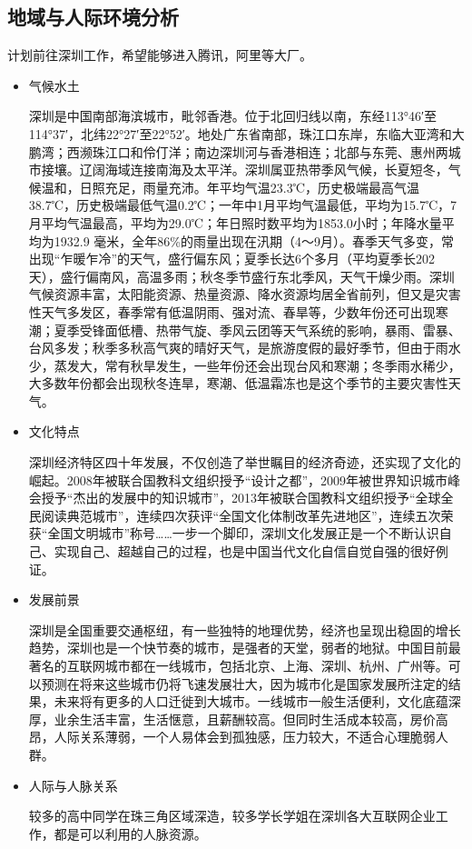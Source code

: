 \documentclass{article}
\begin{document}
\subsection{地域与人际环境分析}
计划前往深圳工作，希望能够进入腾讯，阿里等大厂。
\begin{itemize}
    \item 气候水土\par
    深圳是中国南部海滨城市，毗邻香港。位于北回归线以南，东经113°46′至114°37′，北纬22°27′至22°52′。地处广东省南部，珠江口东岸，东临大亚湾和大鹏湾；西濒珠江口和伶仃洋；南边深圳河与香港相连；北部与东莞、惠州两城市接壤。辽阔海域连接南海及太平洋。深圳属亚热带季风气候，长夏短冬，气候温和，日照充足，雨量充沛。年平均气温23.3℃，历史极端最高气温38.7℃，历史极端最低气温0.2℃；一年中1月平均气温最低，平均为15.7℃，7月平均气温最高，平均为29.0℃；年日照时数平均为1853.0小时；年降水量平均为1932.9 毫米，全年86\%的雨量出现在汛期（4～9月）。春季天气多变，常出现“乍暖乍冷”的天气，盛行偏东风；夏季长达6个多月（平均夏季长202天），盛行偏南风，高温多雨；秋冬季节盛行东北季风，天气干燥少雨。深圳气候资源丰富，太阳能资源、热量资源、降水资源均居全省前列，但又是灾害性天气多发区，春季常有低温阴雨、强对流、春旱等，少数年份还可出现寒潮；夏季受锋面低槽、热带气旋、季风云团等天气系统的影响，暴雨、雷暴、台风多发；秋季多秋高气爽的晴好天气，是旅游度假的最好季节，但由于雨水少，蒸发大，常有秋旱发生，一些年份还会出现台风和寒潮；冬季雨水稀少，大多数年份都会出现秋冬连旱，寒潮、低温霜冻也是这个季节的主要灾害性天气。
    \item 文化特点\par
    深圳经济特区四十年发展，不仅创造了举世瞩目的经济奇迹，还实现了文化的崛起。2008年被联合国教科文组织授予“设计之都”，2009年被世界知识城市峰会授予“杰出的发展中的知识城市”，2013年被联合国教科文组织授予“全球全民阅读典范城市”，连续四次获评“全国文化体制改革先进地区”，连续五次荣获“全国文明城市”称号……一步一个脚印，深圳文化发展正是一个不断认识自己、实现自己、超越自己的过程，也是中国当代文化自信自觉自强的很好例证。
    \item 发展前景\par
    深圳是全国重要交通枢纽，有一些独特的地理优势，经济也呈现出稳固的增长趋势，深圳也是一个快节奏的城市，是强者的天堂，弱者的地狱。中国目前最著名的互联网城市都在一线城市，包括北京、上海、深圳、杭州、广州等。可以预测在将来这些城市仍将飞速发展壮大，因为城市化是国家发展所注定的结果，未来将有更多的人口迁徙到大城市。一线城市一般生活便利，文化底蕴深厚，业余生活丰富，生活惬意，且薪酬较高。但同时生活成本较高，房价高昂，人际关系薄弱，一个人易体会到孤独感，压力较大，不适合心理脆弱人群。
    \item 人际与人脉关系\par
    较多的高中同学在珠三角区域深造，较多学长学姐在深圳各大互联网企业工作，都是可以利用的人脉资源。
    
\end{itemize}
\end{document}
